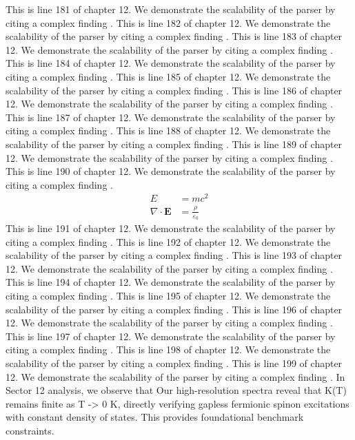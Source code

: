 This is line 181 of chapter 12. We demonstrate the scalability of the parser by citing a complex finding \cite{ref12_181}.
This is line 182 of chapter 12. We demonstrate the scalability of the parser by citing a complex finding \cite{ref12_182}.
This is line 183 of chapter 12. We demonstrate the scalability of the parser by citing a complex finding \cite{ref12_183}.
This is line 184 of chapter 12. We demonstrate the scalability of the parser by citing a complex finding \cite{ref12_184}.
This is line 185 of chapter 12. We demonstrate the scalability of the parser by citing a complex finding \cite{ref12_185}.
This is line 186 of chapter 12. We demonstrate the scalability of the parser by citing a complex finding \cite{ref12_186}.
This is line 187 of chapter 12. We demonstrate the scalability of the parser by citing a complex finding \cite{ref12_187}.
This is line 188 of chapter 12. We demonstrate the scalability of the parser by citing a complex finding \cite{ref12_188}.
This is line 189 of chapter 12. We demonstrate the scalability of the parser by citing a complex finding \cite{ref12_189}.
This is line 190 of chapter 12. We demonstrate the scalability of the parser by citing a complex finding \cite{ref12_190}.
\begin{align*}
  E &= mc^2 \\
  \nabla \cdot \mathbf{E} &= \frac{\rho}{\varepsilon_0}
\end{align*}
This is line 191 of chapter 12. We demonstrate the scalability of the parser by citing a complex finding \cite{ref12_191}.
This is line 192 of chapter 12. We demonstrate the scalability of the parser by citing a complex finding \cite{ref12_192}.
This is line 193 of chapter 12. We demonstrate the scalability of the parser by citing a complex finding \cite{ref12_193}.
This is line 194 of chapter 12. We demonstrate the scalability of the parser by citing a complex finding \cite{ref12_194}.
This is line 195 of chapter 12. We demonstrate the scalability of the parser by citing a complex finding \cite{ref12_195}.
This is line 196 of chapter 12. We demonstrate the scalability of the parser by citing a complex finding \cite{ref12_196}.
This is line 197 of chapter 12. We demonstrate the scalability of the parser by citing a complex finding \cite{ref12_197}.
This is line 198 of chapter 12. We demonstrate the scalability of the parser by citing a complex finding \cite{ref12_198}.
This is line 199 of chapter 12. We demonstrate the scalability of the parser by citing a complex finding \cite{ref12_199}.
In Sector 12 analysis, we observe that Our high-resolution spectra reveal that K(T) remains finite as T -> 0 K, directly verifying gapless fermionic spinon excitations with constant density of states. This provides foundational benchmark constraints.
